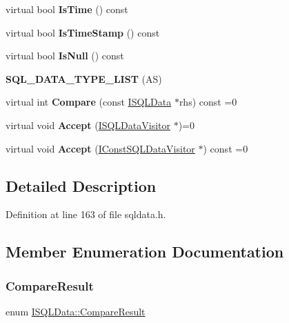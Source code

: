 \begin{DoxyCompactItemize}
virtual bool {\bfseries Is\+Time} () const
\item 
\mbox{\label{class_i_s_q_l_data_a3faf108e70f595160214021646f08173}} 
virtual bool {\bfseries Is\+Time\+Stamp} () const
\item 
\mbox{\label{class_i_s_q_l_data_a132c2df4a7a522e518203c03fa1040ee}} 
virtual bool {\bfseries Is\+Null} () const
\item 
\mbox{\label{class_i_s_q_l_data_a0609b6b92d5ac3b32d7324470619ecb9}} 
{\bfseries S\+Q\+L\+\_\+\+D\+A\+T\+A\+\_\+\+T\+Y\+P\+E\+\_\+\+L\+I\+ST} (AS)
\item 
\mbox{\label{class_i_s_q_l_data_a982e6f228a477bbc252191bf773ea452}} 
virtual int {\bfseries Compare} (const \mbox{\hyperlink{class_i_s_q_l_data}{I\+S\+Q\+L\+Data}} $\ast$rhs) const =0
\item 
\mbox{\label{class_i_s_q_l_data_a735eb9bbb15d0106ba4ec63f4a67a684}} 
virtual void {\bfseries Accept} (\mbox{\hyperlink{class_i_s_q_l_data_visitor}{I\+S\+Q\+L\+Data\+Visitor}} $\ast$)=0
\item 
\mbox{\label{class_i_s_q_l_data_acfa85a6f2f14ff81b1dbe51cb698e6a6}} 
virtual void {\bfseries Accept} (\mbox{\hyperlink{class_i_const_s_q_l_data_visitor}{I\+Const\+S\+Q\+L\+Data\+Visitor}} $\ast$) const =0
\end{DoxyCompactItemize}


\subsection{Detailed Description}


Definition at line 163 of file sqldata.\+h.



\subsection{Member Enumeration Documentation}
\mbox{\label{class_i_s_q_l_data_ac3f308048cf5362aba047c5c776c4f7b}} 
\subsubsection{\texorpdfstring{CompareResult}{CompareResult}}
{\footnotesize\ttfamily enum \mbox{\hyperlink{class_i_s_q_l_data_ac3f308048cf5362aba047c5c776c4f7b}{I\+S\+Q\+L\+Data\+::\+Compare\+Result}}}

